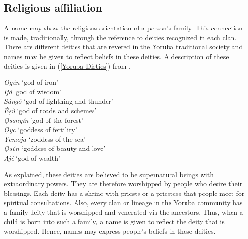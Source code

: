 \documentclass[output=paper,colorlinks,citecolor=brown]{langscibook}
\begin{document}
\subsection{Religious affiliation}

A name may show the religious orientation of a person's family. This connection is made, traditionally, through the reference to deities recognized in each clan. There are different deities that are revered in the Yoruba traditional society and names may be given to reflect beliefs in these deities. A description of these deities is given in (\ref{Yoruba Dieties}) from \citet[78]{Ehineni2019}.


\ea \label{Yoruba Dieties}
\begin{xlist}
\ex \textit{Ogún} `god of iron'\\
\ex \textit{Ifá} `god of wisdom'\\
\ex \textit{Sàngó}	`god of lightning and thunder'\\
\ex \textit{Èṣù} `god of roads and schemes'\\
\ex \textit{Ọ̀sanyín} `god of the forest'\\
\ex \textit{Ọ̀ya} `goddess of fertility' \\
\ex \textit{Yemoja} `goddess of the sea' \\
\ex \textit{Ọ̀sún} `goddess of beauty and love'\\
\ex \textit{Ajé} `god of wealth'\\

\end{xlist}
\z

As \citet{Ehineni2019} explained, these deities are believed to be supernatural beings with extraordinary powers. They are therefore worshipped by people who desire their blessings. Each deity has a shrine with priests or a priestess that people meet for spiritual consultations. Also, every clan or lineage in the Yoruba community has a family deity that is worshipped and venerated via the ancestors. Thus, when a child is born into such a family, a name is given to reflect the deity that is worshipped. Hence, names may express people’s beliefs in these deities. 
\end{document}
